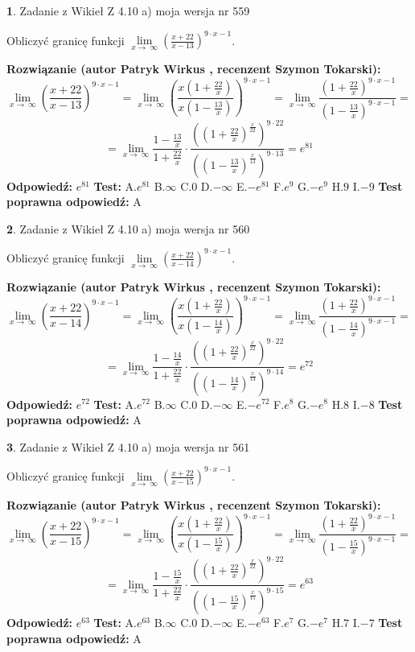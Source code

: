 \documentclass[12pt, a4paper]{article}
\theoremstyle{definition} %
\newtheorem{zad}{}
\newcommand{\zadStart}[1]{\begin{zad}#1\newline}
\newcommand{\zadStop}{\end{zad}}
\newcommand{\rozwStart}[2]{\noindent \textbf{Rozwiązanie (autor #1 , recenzent #2): }\newline}
\newcommand{\rozwStop}{\newline}
\newcommand{\odpStart}{\noindent \textbf{Odpowiedź:}\newline}
\newcommand{\odpStop}{\newline}
\newcommand{\testStart}{\noindent \textbf{Test:}\newline}
\newcommand{\testStop}{\newline}
\newcommand{\kluczStart}{\noindent \textbf{Test poprawna odpowiedź:}\newline}
\newcommand{\kluczStop}{\newline}
\begin{document}
\zadStart{Zadanie z Wikieł Z 4.10 a) moja wersja nr 559}

Obliczyć granicę funkcji  $\lim\limits_{x\to\ \infty}(\frac{x+22}{x-13})^{9\cdot x-1}$.
\zadStop
\rozwStart{Patryk Wirkus}{Szymon Tokarski}
$$\lim\limits_{x\to\ \infty}(\frac{x+22}{x-13})^{9\cdot x-1} = \lim\limits_{x\to\ \infty}(\frac{x(1+\frac{22}{x})}{x(1-\frac{13}{x})})^{9\cdot x-1}=\lim\limits_{x\to\ \infty}\frac{(1+\frac{22}{x})^{9\cdot x-1}}{(1-\frac{13}{x})^{9\cdot x-1}}=$$
$$=\lim\limits_{x\to\ \infty}\frac{1-\frac{13}{x}}{1+\frac{22}{x}}\cdot\frac{((1+\frac{22}{x})^{\frac{x}{22}})^{9\cdot22}}{((1-\frac{13}{x})^{\frac{x}{13}})^{9\cdot13}}=e^{81}$$
\rozwStop
\odpStart
$e^{81}$
\odpStop
\testStart
A.$e^{81}$ B.$\infty$ C.$0$ D.$-\infty$ E.$-e^{81}$
F.$e^{9}$ G.$-e^{9}$
H.$9$
I.$-9$
\testStop
\kluczStart
A
\kluczStop



\zadStart{Zadanie z Wikieł Z 4.10 a) moja wersja nr 560}

Obliczyć granicę funkcji  $\lim\limits_{x\to\ \infty}(\frac{x+22}{x-14})^{9\cdot x-1}$.
\zadStop
\rozwStart{Patryk Wirkus}{Szymon Tokarski}
$$\lim\limits_{x\to\ \infty}(\frac{x+22}{x-14})^{9\cdot x-1} = \lim\limits_{x\to\ \infty}(\frac{x(1+\frac{22}{x})}{x(1-\frac{14}{x})})^{9\cdot x-1}=\lim\limits_{x\to\ \infty}\frac{(1+\frac{22}{x})^{9\cdot x-1}}{(1-\frac{14}{x})^{9\cdot x-1}}=$$
$$=\lim\limits_{x\to\ \infty}\frac{1-\frac{14}{x}}{1+\frac{22}{x}}\cdot\frac{((1+\frac{22}{x})^{\frac{x}{22}})^{9\cdot22}}{((1-\frac{14}{x})^{\frac{x}{14}})^{9\cdot14}}=e^{72}$$
\rozwStop
\odpStart
$e^{72}$
\odpStop
\testStart
A.$e^{72}$ B.$\infty$ C.$0$ D.$-\infty$ E.$-e^{72}$
F.$e^{8}$ G.$-e^{8}$
H.$8$
I.$-8$
\testStop
\kluczStart
A
\kluczStop



\zadStart{Zadanie z Wikieł Z 4.10 a) moja wersja nr 561}

Obliczyć granicę funkcji  $\lim\limits_{x\to\ \infty}(\frac{x+22}{x-15})^{9\cdot x-1}$.
\zadStop
\rozwStart{Patryk Wirkus}{Szymon Tokarski}
$$\lim\limits_{x\to\ \infty}(\frac{x+22}{x-15})^{9\cdot x-1} = \lim\limits_{x\to\ \infty}(\frac{x(1+\frac{22}{x})}{x(1-\frac{15}{x})})^{9\cdot x-1}=\lim\limits_{x\to\ \infty}\frac{(1+\frac{22}{x})^{9\cdot x-1}}{(1-\frac{15}{x})^{9\cdot x-1}}=$$
$$=\lim\limits_{x\to\ \infty}\frac{1-\frac{15}{x}}{1+\frac{22}{x}}\cdot\frac{((1+\frac{22}{x})^{\frac{x}{22}})^{9\cdot22}}{((1-\frac{15}{x})^{\frac{x}{15}})^{9\cdot15}}=e^{63}$$
\rozwStop
\odpStart
$e^{63}$
\odpStop
\testStart
A.$e^{63}$ B.$\infty$ C.$0$ D.$-\infty$ E.$-e^{63}$
F.$e^{7}$ G.$-e^{7}$
H.$7$
I.$-7$
\testStop
\kluczStart
A
\kluczStop
\end{document}
